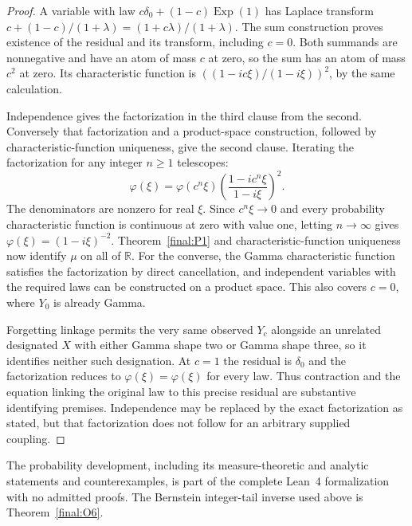 \begin{proof}
A variable with law $c\delta_0+(1-c)\operatorname{Exp}(1)$ has
Laplace transform
$c+(1-c)/(1+\lambda)=(1+c\lambda)/(1+\lambda)$.
The sum construction proves existence of the residual and its
transform, including $c=0$.  Both summands are nonnegative and
have an atom of mass $c$ at zero, so the sum has an atom of mass $c^2$ at zero.
Its characteristic function is
$((1-ic\xi)/(1-i\xi))^2$, by the same calculation.

Independence gives the factorization in the third clause from the
second.  Conversely that factorization and a product-space
construction, followed by characteristic-function uniqueness, give
the second clause.  Iterating the factorization for any integer
$n\geq1$ telescopes:
\[
 \varphi(\xi)=\varphi(c^n\xi)
       \left(\frac{1-ic^n\xi}{1-i\xi}\right)^2.
\]
The denominators are nonzero for real $\xi$.  Since $c^n\xi\to0$
and every probability characteristic function is continuous at
zero with value one, letting $n\to\infty$ gives
$\varphi(\xi)=(1-i\xi)^{-2}$.  Theorem~\ref{final:P1} and
characteristic-function uniqueness now identify $\mu$ on all of
$\mathbb R$.  For the converse, the Gamma characteristic function
satisfies the factorization by direct cancellation, and independent
variables with the required laws can be constructed on a product
space.  This also covers $c=0$, where $Y_0$ is already Gamma.

Forgetting linkage permits the very same observed $Y_c$ alongside
an unrelated designated $X$ with either Gamma shape two or Gamma
shape three, so it identifies neither such designation.  At $c=1$
the residual is $\delta_0$ and the factorization reduces to
$\varphi(\xi)=\varphi(\xi)$ for every law.  Thus contraction and
the equation linking the original law to this precise residual
are substantive identifying premises.  Independence may be
replaced by the exact factorization as stated, but that
factorization does not follow for an arbitrary supplied coupling.
\end{proof}

\begin{remark}[Formalization]
\label{final:P-formalization-scope}
The probability development, including its measure-theoretic and
analytic statements and counterexamples, is part of the complete
Lean~4 formalization with no admitted proofs. The Bernstein
integer-tail inverse used above is Theorem~\ref{final:O6}.
\end{remark}
